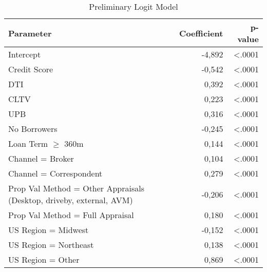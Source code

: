 \begin{table}[H]
\centering
\begin{tabular}{p{8cm}rr}\toprule
\textbf{Parameter}                                                   & \textbf{Coefficient} & \textbf{p-value} \\\midrule
Intercept                                                            & -4,892               & \textless{}.0001 \\
Credit Score                                                         & -0,542               & \textless{}.0001 \\
DTI                                                         		 & 0,392                & \textless{}.0001 \\
CLTV                                                                 & 0,223                & \textless{}.0001 \\
UPB                                                                  & 0,316                & \textless{}.0001 \\
No Borrowers                                                         & -0,245               & \textless{}.0001 \\
Loan Term $\geq$ 360m                                                & 0,144                & \textless{}.0001 \\
Channel = Broker                                                     & 0,104                & \textless{}.0001 \\
Channel = Correspondent                                              & 0,279                & \textless{}.0001 \\
Prop Val Method = Other Appraisals (Desktop, driveby, external, AVM) & -0,206               & \textless{}.0001 \\
Prop Val Method = Full Appraisal                                     & 0,180                & \textless{}.0001 \\
US Region = Midwest                                                  & -0,152               & \textless{}.0001 \\
US Region = Northeast                                                & 0,138                & \textless{}.0001 \\
US Region = Other                                                    & 0,869                & \textless{}.0001\\\bottomrule
\end{tabular}
\caption{Preliminary Logit Model}
\label{tab:re_prelLogModel}
\end{table}

